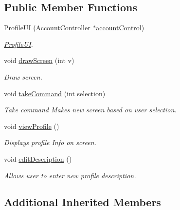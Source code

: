 \subsection*{Public Member Functions}
\begin{DoxyCompactItemize}
\item 
\hyperlink{classProfileUI_af3f91f5a6fc345b30ced52ca482c33d9}{Profile\+UI} (\hyperlink{classAccountController}{Account\+Controller} $\ast$account\+Control)
\begin{DoxyCompactList}\small\item\em \hyperlink{classProfileUI}{Profile\+UI}. \end{DoxyCompactList}\item 
void \hyperlink{classProfileUI_af2a6deb2877b8da70d9d102a646725bd}{draw\+Screen} (int v)
\begin{DoxyCompactList}\small\item\em Draw screen. \end{DoxyCompactList}\item 
void \hyperlink{classProfileUI_a139ab61438de37e49a980e90c4b53138}{take\+Command} (int selection)
\begin{DoxyCompactList}\small\item\em Take command Makes new screen based on user selection. \end{DoxyCompactList}\item 
void \hyperlink{classProfileUI_a22b78fb6c370f0ad5350ba1d1adf488c}{view\+Profile} ()\hypertarget{classProfileUI_a22b78fb6c370f0ad5350ba1d1adf488c}{}\label{classProfileUI_a22b78fb6c370f0ad5350ba1d1adf488c}

\begin{DoxyCompactList}\small\item\em Displays profile Info on screen. \end{DoxyCompactList}\item 
void \hyperlink{classProfileUI_a99a600bf2aebab26fdc100b2d720b1c2}{edit\+Description} ()\hypertarget{classProfileUI_a99a600bf2aebab26fdc100b2d720b1c2}{}\label{classProfileUI_a99a600bf2aebab26fdc100b2d720b1c2}

\begin{DoxyCompactList}\small\item\em Allows user to enter new profile description. \end{DoxyCompactList}\end{DoxyCompactItemize}
\subsection*{Additional Inherited Members}


